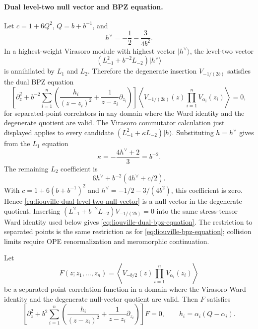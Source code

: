 \paragraph{Dual level-two null vector and BPZ equation.}
Let \(c=1+6Q^2\), \(Q=b+b^{-1}\), and
\[
  h^\vee=-\frac12-\frac{3}{4b^2}.
\]
In a highest-weight Virasoro module with highest vector \(|h^\vee\rangle\),
the level-two vector
\begin{equation}
  \left(L_{-1}^2+b^{-2}L_{-2}\right)|h^\vee\rangle
  \label{eq:liouville-dual-level-two-null-vector}
\end{equation}
is annihilated by \(L_1\) and \(L_2\).  Therefore the degenerate insertion
\(V_{-1/(2b)}\) satisfies the dual BPZ equation
\begin{equation}
  \left[
    \partial_z^2
    +b^{-2}\sum_{i=1}^n
    \left(
      \frac{h_i}{(z-z_i)^2}
      +\frac1{z-z_i}\partial_{z_i}
    \right)
  \right]
  \left\langle
    V_{-1/(2b)}(z)\prod_{i=1}^n V_{\alpha_i}(z_i)
  \right\rangle
  =
  0 ,
  \label{eq:liouville-dual-bpz-equation}
\end{equation}
for separated-point correlators in any domain where the Ward identity and
the degenerate quotient are valid.
The Virasoro commutator calculation just displayed applies to every candidate
\((L_{-1}^2+\kappa L_{-2})|h\rangle\).  Substituting
\(h=h^\vee\) gives from the \(L_1\) equation
\[
  \kappa=-\frac{4h^\vee+2}{3}=b^{-2}.
\]
The remaining \(L_2\) coefficient is
\[
  6h^\vee+b^{-2}(4h^\vee+c/2).
\]
With \(c=1+6(b+b^{-1})^2\) and
\(h^\vee=-1/2-3/(4b^2)\), this coefficient is zero.  Hence
\eqref{eq:liouville-dual-level-two-null-vector} is a null vector in the
degenerate quotient.  Inserting
\((L_{-1}^2+b^{-2}L_{-2})V_{-1/(2b)}=0\) into the same stress-tensor Ward
identity used below gives \eqref{eq:liouville-dual-bpz-equation}.  The
restriction to separated points is the same restriction as for
\eqref{eq:liouville-bpz-equation}; collision limits require OPE
renormalization and meromorphic continuation.

\begin{proposition}
\label{prop:liouville-bpz-equation}
Let
\[
  F(z;z_1,\ldots,z_n)
  =
  \left\langle
    V_{-b/2}(z)\prod_{i=1}^n V_{\alpha_i}(z_i)
  \right\rangle
\]
be a separated-point correlation function in a domain where the Virasoro Ward
identity and the degenerate null-vector quotient are valid.  Then \(F\)
satisfies
\begin{equation}
  \left[
    \partial_z^2
    +b^2\sum_{i=1}^n
    \left(
      \frac{h_i}{(z-z_i)^2}
      +\frac1{z-z_i}\partial_{z_i}
    \right)
  \right]F=0,
  \qquad
  h_i=\alpha_i(Q-\alpha_i).
  \label{eq:liouville-bpz-equation}
\end{equation}
\end{proposition}

